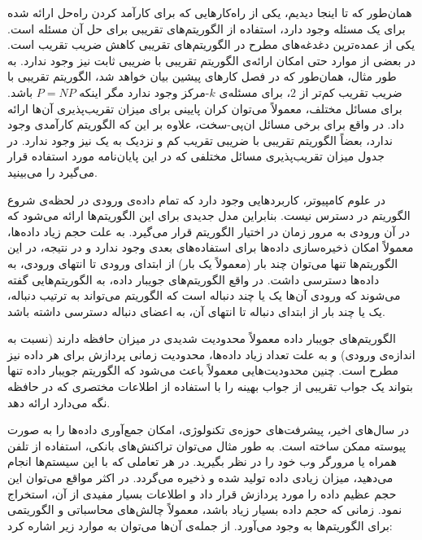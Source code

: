 

همان‌طور که تا اینجا دیدیم، یکی از راه‌کارهایی که برای کارآمد کردن راه‌حل ارائه شده برای یک مسئله وجود دارد، استفاده از الگوریتم‌های تقریبی برای حل آن مسئله است.
یکی از عمده‌ترین دغدغه‌های مطرح در الگوریتم‌های تقریبی کاهش ضریب تقریب است.
در بعضی از موارد حتی امکان ارائه‌ی الگوریتم تقریبی با ضریبی ثابت نیز وجود ندارد.
به طور مثال، همان‌طور که در فصل کارهای پیشین بیان خواهد شد، الگوریتم تقریبی با ضریب تقریب کم‌تر از $2$، برای مسئله‌ی $k$-مرکز وجود ندارد مگر اینکه $P = NP$ باشد.
برای مسائل مختلف، معمولاً می‌توان کران پایینی برای میزان تقریب‌پذیری آن‌ها ارائه داد.
در واقع برای برخی مسائل ان‌پی-سخت، علاوه بر این که الگوریتم کارآمدی وجود ندارد، بعضاً الگوریتم تقریبی با ضریبی تقریب کم و نزدیک به یک نیز وجود ندارد.
در جدول   میزان تقریب‌پذیری مسائل مختلفی که در این پایان‌نامه مورد استفاده قرار می‌گیرد را می‌بینید.


در علوم کامپیوتر، کاربردهایی وجود دارد که تمام داده‌ی ورودی در لحظه‌ی شروع الگوریتم در دسترس نیست.
بنابراین مدل جدیدی برای این الگوریتم‌ها ارائه می‌شود که در آن ورودی به مرور زمان در اختیار الگوریتم قرار می‌گیرد.
به علت حجم زیاد داده‌ها، معمولاً امکان ذخیره‌سازی داده‌ها برای استفاده‌های بعدی وجود ندارد و در نتیجه، در این الگوریتم‌ها تنها می‌توان چند بار (معمولاً یک بار) از ابتدای ورودی تا انتهای ورودی، به داده‌ها دسترسی داشت.
در واقع الگوریتم‌های جویبار داده، به الگوریتم‌هایی گفته می‌شوند که ورودی آن‌ها یک یا چند دنباله است که الگوریتم می‌تواند به ترتیب دنباله، یک یا چند بار از ابتدای دنباله تا انتهای آن، به اعضای دنباله دسترسی داشته باشد.

الگوریتم‌های جویبار داده معمولاً محدودیت شدیدی در میزان حافظه دارند (نسبت به اندازه‌ی ورودی) و به علت تعداد زیاد داده‌ها، محدودیت زمانی پردازش برای هر داده نیز مطرح است. چنین محدودیت‌هایی معمولاً باعث می‌شود که الگوریتم جویبار داده تنها بتواند یک جواب تقریبی از جواب بهینه را با استفاده از اطلاعات مختصری که در حافظه نگه می‌دارد ارائه دهد.

در سال‌های اخیر، پیشرفت‌های حوزه‌ی تکنولوژی، امکان جمع‌آوری داده‌ها را به صورت پیوسته ممکن ساخته است.
به طور مثال می‌توان تراکنش‌های بانکی، استفاده از تلفن همراه یا مرورگر وب خود را در نظر بگیرید.
در هر تعاملی که با این سیستم‌ها انجام می‌دهید، میزان زیادی داده تولید شده و ذخیره می‌گردد.
در اکثر مواقع می‌توان این حجم عظیم داده را مورد پردازش قرار داد و اطلاعات بسیار مفیدی از آن، استخراج نمود.
زمانی که حجم داده بسیار زیاد باشد، معمولاً چالش‌های محاسباتی و الگوریتمی برای الگوریتم‌ها به وجود می‌آورد.
از جمله‌ی آن‌ها می‌توان به موارد زیر اشاره کرد:

